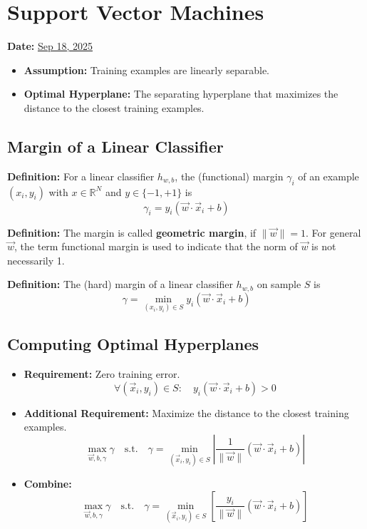 \section{Support Vector Machines}
\textbf{Date:} \underline{Sep 18, 2025}

\begin{itemize}
    \item \textbf{Assumption:} Training examples are linearly separable.
    \item \textbf{Optimal Hyperplane:} The separating hyperplane that maximizes the distance to the closest training examples.
\end{itemize}

\subsection{Margin of a Linear Classifier}

\textbf{Definition:} For a linear classifier $h_{w,b}$, the (functional) margin $\gamma_i$ of an example $(x_i, y_i)$ with $x \in \mathbb{R}^N$ and $y \in \{-1, +1\}$ is
\[
\gamma_i = y_i \left( \vec{w} \cdot \vec{x}_i + b \right)
\]

\textbf{Definition:} The margin is called \textbf{geometric margin}, if $\|\vec{w}\| = 1$. For general $\vec{w}$, the term functional margin is used to indicate that the norm of $\vec{w}$ is not necessarily 1.

\textbf{Definition:} The (hard) margin of a linear classifier $h_{w,b}$ on sample $S$ is
\[
\gamma = \min_{(x_i, y_i) \in S} y_i \left( \vec{w} \cdot \vec{x}_i + b \right)
\]

\subsection{Computing Optimal Hyperplanes}

\begin{itemize}
    \item \textbf{Requirement:} Zero training error.
    \[
        \forall (\vec{x}_i, y_i) \in S: \quad y_i \left( \vec{w} \cdot \vec{x}_i + b \right) > 0
    \]
    \item \textbf{Additional Requirement:} Maximize the distance to the closest training examples.
    \[
        \max_{\vec{w}, b, \gamma} \gamma \quad \text{s.t.} \quad \gamma = \min_{(\vec{x}_i, y_i) \in S} \left| \frac{1}{\|\vec{w}\|} \left( \vec{w} \cdot \vec{x}_i + b \right) \right|
    \]
    \item \textbf{Combine:}
    \[
        \max_{\vec{w}, b, \gamma} \gamma \quad \text{s.t.} \quad \gamma = \min_{(\vec{x}_i, y_i) \in S} \left[ \frac{y_i}{\|\vec{w}\|} \left( \vec{w} \cdot \vec{x}_i + b \right) \right]
    \]
\end{itemize}

